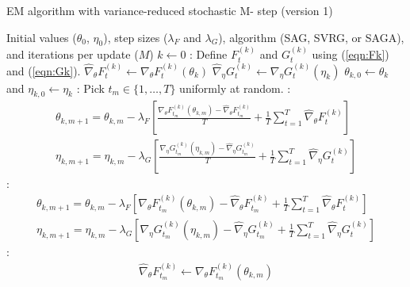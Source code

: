\begin{algorithm}
\caption{EM algorithm with variance-reduced stochastic M- step (version 1)}\label{alg:EM-SO}
\begin{algorithmic}[1]
\Require Initial values ($\theta_{0}$, $\eta_{0}$), step sizes ($\lambda_F$ and $\lambda_G$), algorithm (SAG, SVRG, or SAGA), and iterations per update ($M$)
%
\State $k \leftarrow 0$
%
:
    \State Define $F_t^{(k)}$ and $G_t^{(k)}$ using (\ref{eqn:Fk}) and (\ref{eqn:Gk}). 
    \State $\widehat \nabla_\theta F_t^{(k)} \leftarrow \nabla_\theta F_t^{(k)} (\theta_k)$
    \State $\widehat \nabla_\eta G_t^{(k)} \leftarrow \nabla_\eta G_t^{(k)} (\eta_k)$ 
\EndFor
%
\State $\theta_{k,0} \leftarrow \theta_k$ and $\eta_{k,0} \leftarrow \eta_k$
%
:
    \State Pick $t_m \in \{1,\ldots,T\}$ uniformly at random.
    :
        \begin{gather}
            \theta_{k,m+1} = \theta_{k,m} - \lambda_F \left[\frac{\nabla_\theta F_{t_m}^{(k)}(\theta_{k,m}) - \widehat \nabla_\theta F_{t_m}^{(k)}}{T} + \frac{1}{T} \sum_{t=1}^T \widehat \nabla_\theta F^{(k)}_{t} \right] \\
            \eta_{k,m+1} = \eta_{k,m} - \lambda_G \left[\frac{\nabla_\eta G_{t_m}^{(k)}(\eta_{k,m}) - \widehat \nabla_\eta G_{t_m}^{(k)}}{T} + \frac{1}{T} \sum_{t=1}^T \widehat \nabla_\eta G^{(k)}_{t} \right]
        \end{gather}
    :
        \begin{gather}
            \theta_{k,m+1} = \theta_{k,m} - \lambda_F \left[\nabla_\theta F_{t_m}^{(k)}(\theta_{k,m}) - \widehat \nabla_\theta F_{t_m}^{(k)} + \frac{1}{T} \sum_{t=1}^T \widehat \nabla_\theta F^{(k)}_{t} \right] \\
            \eta_{k,m+1} = \eta_{k,m} - \lambda_G \left[\nabla_\eta G_{t_m}^{(k)}(\eta_{k,m}) - \widehat \nabla_\eta G_{t_m}^{(k)} + \frac{1}{T} \sum_{t=1}^T \widehat \nabla_\eta G^{(k)}_{t} \right]
        \end{gather}
    \EndIf
    :
        \begin{gather}
            \widehat \nabla_\theta F_{t_m}^{(k)} \leftarrow \nabla_\theta F_{t_m}^{(k)}(\theta_{k,m}) \\

\end{gather}
\end{algorithmic}
\end{algorithm}

